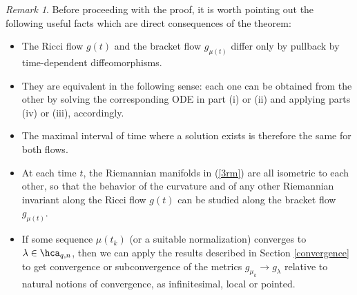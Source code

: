 \documentclass[11pt]{amsart}
\theoremstyle{plain}
\theoremstyle{definition}
\theoremstyle{remark}
\newtheorem{remark}[theorem]{Remark}
\begin{document}
\begin{remark}\label{remeq}
Before proceeding with the proof, it is worth pointing out the following useful facts which are direct consequences of the theorem:

\begin{itemize}
\item The Ricci flow $g(t)$ and the bracket flow $g_{\mu(t)}$ differ only by pullback by time-dependent diffeomorphisms.

\item They are equivalent in the following sense: each one can be obtained from the other by solving the corresponding ODE in part (i) or (ii) and applying parts (iv) or (iii), accordingly.

\item The maximal interval of time where a solution exists is therefore the same for both flows.

\item At each time $t$, the Riemannian manifolds in (\ref{3rm}) are all isometric to each other, so that the behavior
of the curvature and of any other Riemannian invariant along the
Ricci flow $g(t)$ can be studied along the bracket flow $g_{\mu(t)}$.

\item If some sequence $\mu(t_k)$ (or a suitable normalization) converges to $\lambda\in\hca_{q,n}$, then we can apply the results described in Section \ref{convergence} to get convergence or subconvergence of the metrics $g_{\mu_k}\to g_{\lambda}$ relative to natural notions of convergence, as infinitesimal, local or pointed.
\end{itemize}
\end{remark}
\end{document}
